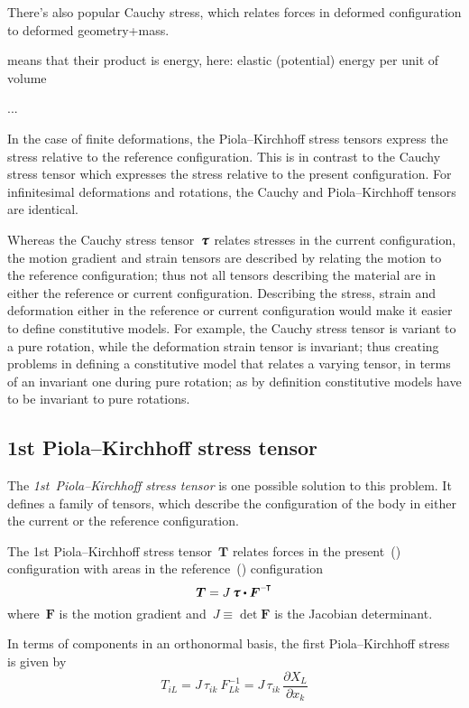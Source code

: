 There’s also popular Cauchy stress, which relates forces in deformed configuration to deformed geometry+mass.

 means that their product is energy, here: elastic (potential) energy per unit of volume


...


{\small
In the case of finite deformations, the Piola\hbox{--}Kirchhoff stress tensors express the stress relative to the reference configuration. This is in contrast to the Cauchy stress tensor which expresses the stress relative to the present configuration. For infinitesimal deformations and rotations, the Cauchy and Piola\hbox{--}Kirchhoff tensors are identical.

Whereas the Cauchy stress tensor~${\cauchystress}$ relates stresses in the current configuration, the motion gradient and strain tensors are described by relating the motion to the reference configuration; thus not all tensors describing the material are in either the reference or current configuration. Describing the stress, strain and deformation either in the reference or current configuration would make it easier to define constitutive models. For example, the Cauchy stress tensor is variant to a pure rotation, while the deformation strain tensor is invariant; thus creating problems in defining a constitutive model that relates a varying tensor, in terms of an invariant one during pure rotation; as by definition constitutive models have to be invariant to pure rotations.

\subsection*{1st Piola\hbox{--}Kirchhoff stress tensor}

The \emph{1st~Piola\hbox{--}Kirchhoff stress tensor} is one possible solution to this problem. It defines a family of tensors, which describe the configuration of the body in either the current or the reference configuration.

The 1st Piola\hbox{--}Kirchhoff stress tensor~$\bm{T}$ relates forces in the present~() configuration with areas in the reference~() configuration
\[
\bm{T} = J \, \cauchystress \dotp \bm{F}^{\expminusT}
\]
where~$\bm{F}$ is the motion gradient and~${J \equiv \operatorname{det} \bm{F}}$ is the Jacobian determinant.

In terms of components in an orthonormal basis, the first Piola\hbox{--}Kirchhoff stress is given by
\[
T_{iL} = J \, \tau_{ik}~F_{Lk}^{-1} = J \, \tau_{ik} \, \frac{\partial X_{L}}{\partial x_{k}}
\]

}
